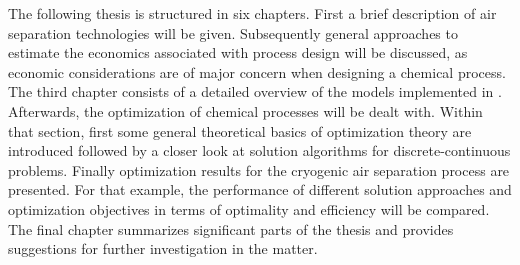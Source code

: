 The following thesis is structured in six chapters. First a brief description of air separation technologies
will be given. Subsequently general approaches to estimate the economics associated with process design will be discussed,
as economic considerations are of major concern when designing a chemical process.
The third chapter consists of a detailed overview of the models implemented in \gproms. Afterwards,
the optimization of chemical processes will be dealt with. Within that section, first some general theoretical
basics of optimization theory are introduced followed by a closer look at solution algorithms for
discrete-continuous problems. Finally optimization results for the cryogenic air separation
process are presented. For that example, the performance of different solution approaches and optimization objectives
in terms of optimality and efficiency will be compared.
The final chapter summarizes significant parts of the thesis and provides suggestions for further investigation in
the matter.
